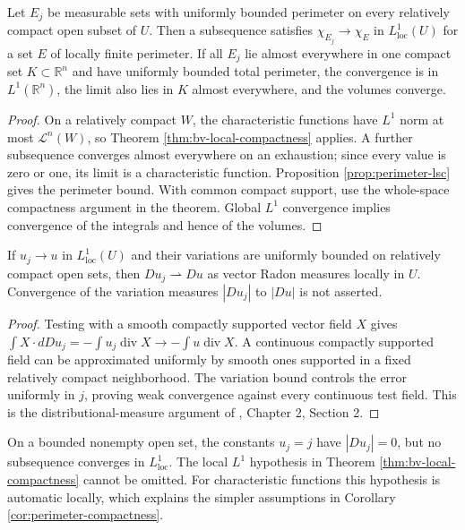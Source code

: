 \begin{corollary}\label{cor:perimeter-compactness}
Let $E_j$ be measurable sets with uniformly bounded perimeter on every relatively compact open subset of $U$. Then a subsequence satisfies $\chi_{E_j}\to\chi_E$ in $L^1_{\mathrm{loc}}(U)$ for a set $E$ of locally finite perimeter. If all $E_j$ lie almost everywhere in one compact set $K\subset\mathbb R^n$ and have uniformly bounded total perimeter, the convergence is in $L^1(\mathbb R^n)$, the limit also lies in $K$ almost everywhere, and the volumes converge.
\end{corollary}
\begin{proof}
On a relatively compact $W$, the characteristic functions have $L^1$ norm at most $\mathcal L^n(W)$, so Theorem \ref{thm:bv-local-compactness} applies. A further subsequence converges almost everywhere on an exhaustion; since every value is zero or one, its limit is a characteristic function. Proposition \ref{prop:perimeter-lsc} gives the perimeter bound. With common compact support, use the whole-space compactness argument in the theorem. Global $L^1$ convergence implies convergence of the integrals and hence of the volumes.
\end{proof}

\begin{proposition}\label{prop:bv-derivative-convergence}
If $u_j\to u$ in $L^1_{\mathrm{loc}}(U)$ and their variations are uniformly bounded on relatively compact open sets, then $Du_j\rightharpoonup Du$ as vector Radon measures locally in $U$. Convergence of the variation measures $|Du_j|$ to $|Du|$ is not asserted.
\end{proposition}
\begin{proof}
Testing with a smooth compactly supported vector field $X$ gives $\int X\cdot dDu_j=-\int u_j\operatorname{div}X\to-\int u\operatorname{div}X$. A continuous compactly supported field can be approximated uniformly by smooth ones supported in a fixed relatively compact neighborhood. The variation bound controls the error uniformly in $j$, proving weak convergence against every continuous test field. This is the distributional-measure argument of \cite{Sim18}, Chapter 2, Section 2.
\end{proof}

\begin{example}\label{ex:bv-constants}
On a bounded nonempty open set, the constants $u_j=j$ have $|Du_j|=0$, but no subsequence converges in $L^1_{\mathrm{loc}}$. The local $L^1$ hypothesis in Theorem \ref{thm:bv-local-compactness} cannot be omitted. For characteristic functions this hypothesis is automatic locally, which explains the simpler assumptions in Corollary \ref{cor:perimeter-compactness}.
\end{example}

